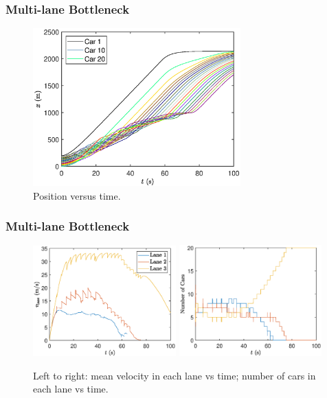 \documentclass{beamer}
\begin{document}
\begin{frame}
  \frametitle{Multi-lane Bottleneck}
  \begin{figure}[H]
    \includegraphics[width=8cm]{mlbn_x.eps}
    \caption{Position versus time.} 
\end{figure}
\end{frame}

\begin{frame}
  \frametitle{Multi-lane Bottleneck}
  \begin{figure}[H]
    \includegraphics[width=5.5cm]{mlbn_laneSpeed.eps}
    \includegraphics[width=5.5cm]{mlbn_lanecars.eps}
    \caption{Left to right: mean velocity in each lane vs time; number of cars in each lane vs time.}
\end{figure}
\end{frame}
\end{document}

